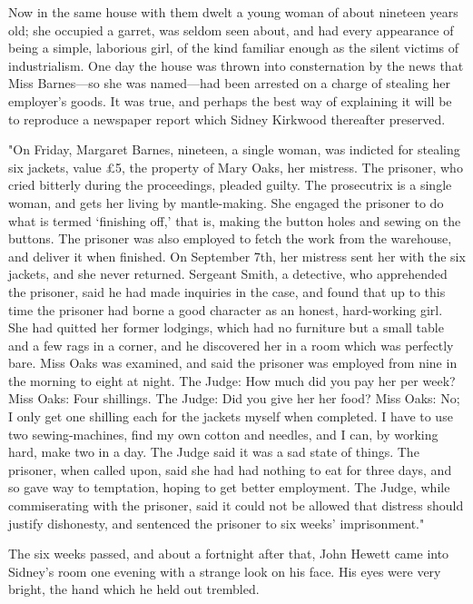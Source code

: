 Now in the same house with them dwelt a young woman of about nineteen
years old; she occupied a garret, was seldom seen about, and had every
appearance of being a simple, laborious girl, of the kind familiar
enough as the silent victims of industrialism. One day the house was
thrown into consternation by the news that Miss Barnes---so she was
named---had been arrested on a charge of stealing her employer's goods.
It was true, and perhaps the best way of explaining it will be to
reproduce a newspaper report which Sidney Kirkwood thereafter preserved.

"On Friday, Margaret Barnes, nineteen, a single woman, was indicted for
stealing six jackets, value £5, the property of Mary Oaks, her mistress.
The prisoner, who cried bitterly during the proceedings, pleaded guilty.
The prosecutrix is a single woman, and gets her living by mantle-making.
She engaged the prisoner to do what is termed `finishing off,' that is,
making the button holes and sewing {}on the buttons. The prisoner was
also employed to fetch the work from the warehouse, and deliver it when
finished. On September 7th, her mistress sent her with the six jackets,
and she never returned. Sergeant Smith, a detective, who apprehended the
prisoner, said he had made inquiries in the case, and found that up to
this time the prisoner had borne a good character as an honest,
hard-working girl. She had quitted her former lodgings, which had no
furniture but a small table and a few rags in a corner, and he
discovered her in a room which was perfectly bare. Miss Oaks was
examined, and said the prisoner was employed from nine in the morning to
eight at night. The Judge: How much did you pay her per week? Miss Oaks:
Four shillings. The Judge: Did you give her her food? Miss Oaks: No; I
only get one shilling each for the jackets myself when completed. I have
to use two sewing-machines, find my own cotton and needles, and I can,
by working hard, make two in a day. The Judge said it was a sad state of
things. The {}prisoner, when called upon, said she had had nothing to
eat for three days, and so gave way to temptation, hoping to get better
employment. The Judge, while commiserating with the prisoner, said it
could not be allowed that distress should justify dishonesty, and
sentenced the prisoner to six weeks' imprisonment."

The six weeks passed, and about a fortnight after that, John Hewett came
into Sidney's room one evening with a strange look on his face. His eyes
were very bright, the hand which he held out trembled.

